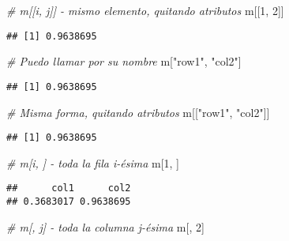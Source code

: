 \documentclass[]{article}
\newenvironment{Shaded}{\begin{snugshade}}{\end{snugshade}}
\newcommand{\DecValTok}[1]{\textcolor[rgb]{0.00,0.00,0.81}{#1}}
\newcommand{\StringTok}[1]{\textcolor[rgb]{0.31,0.60,0.02}{#1}}
\newcommand{\CommentTok}[1]{\textcolor[rgb]{0.56,0.35,0.01}{\textit{#1}}}
\newcommand{\NormalTok}[1]{#1}
\begin{document}
\begin{Shaded}
\begin{Highlighting}[]
\CommentTok{# m[[i, j]] - mismo elemento, quitando atributos}
\NormalTok{m[[}\DecValTok{1}\NormalTok{, }\DecValTok{2}\NormalTok{]]}
\end{Highlighting}
\end{Shaded}

\begin{verbatim}
## [1] 0.9638695
\end{verbatim}

\begin{Shaded}
\begin{Highlighting}[]
\CommentTok{# Puedo llamar por su nombre}
\NormalTok{m[}\StringTok{"row1"}\NormalTok{, }\StringTok{"col2"}\NormalTok{]}
\end{Highlighting}
\end{Shaded}

\begin{verbatim}
## [1] 0.9638695
\end{verbatim}

\begin{Shaded}
\begin{Highlighting}[]
\CommentTok{# Misma forma, quitando atributos}
\NormalTok{m[[}\StringTok{"row1"}\NormalTok{, }\StringTok{"col2"}\NormalTok{]]}
\end{Highlighting}
\end{Shaded}

\begin{verbatim}
## [1] 0.9638695
\end{verbatim}

\begin{Shaded}
\begin{Highlighting}[]
\CommentTok{# m[i, ] - toda la fila i-ésima}
\NormalTok{m[}\DecValTok{1}\NormalTok{, ]}
\end{Highlighting}
\end{Shaded}

\begin{verbatim}
##      col1      col2 
## 0.3683017 0.9638695
\end{verbatim}

\begin{Shaded}
\begin{Highlighting}[]
\CommentTok{# m[, j] - toda la columna j-ésima}
\NormalTok{m[, }\DecValTok{2}\NormalTok{]}
\end{Highlighting}
\end{Shaded}
\end{document}
